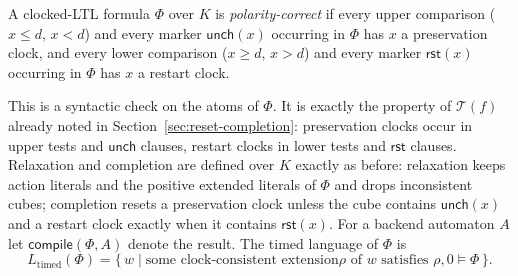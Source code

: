 \documentclass[manuscript]{acmart}
\providecommand{\Reset}{}\renewcommand{\Reset}{\mathsf{rst}}
\newcommand{\Unch}{\mathsf{unch}}
\newcommand{\T}{\mathcal{T}}
\begin{document}
\begin{definition}
\label{def:polarity}
A clocked-LTL formula $\Phi$ over $K$ is \emph{polarity-correct} if every
upper comparison ($x\le d$, $x<d$) and every marker $\Unch(x)$ occurring in
$\Phi$ has $x$ a preservation clock, and every lower comparison ($x\ge d$,
$x>d$) and every marker $\Reset(x)$ occurring in $\Phi$ has $x$ a restart
clock.
\end{definition}

This is a syntactic check on the atoms of $\Phi$. It is exactly the property of
$\T(f)$ already noted in Section~\ref{sec:reset-completion}: preservation
clocks occur in upper tests and $\Unch$ clauses, restart clocks in lower tests
and $\Reset$ clauses. Relaxation and completion are defined over $K$ exactly as
before: relaxation keeps action literals and the positive extended literals of
$\Phi$ and drops inconsistent cubes; completion resets a preservation clock
unless the cube contains $\Unch(x)$ and a restart clock exactly when it
contains $\Reset(x)$. For a backend automaton $A$ let
$\mathsf{compile}(\Phi,A)$ denote the result. The timed language of $\Phi$ is
\[
L_{\mathrm{timed}}(\Phi)=\{\,w \mid \text{some clock-consistent extension
$\rho$ of $w$ satisfies } \rho,0\models\Phi\,\}.
\]
\end{document}
